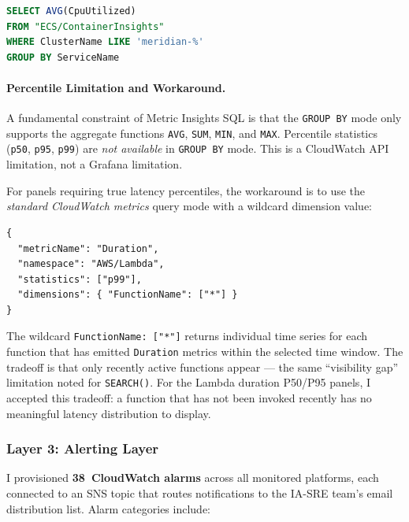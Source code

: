 \begin{lstlisting}[language=SQL, caption={Metric Insights SQL --- Platform-Filtered ECS CPU}]
SELECT AVG(CpuUtilized)
FROM "ECS/ContainerInsights"
WHERE ClusterName LIKE 'meridian-%'
GROUP BY ServiceName
\end{lstlisting}

\paragraph{Percentile Limitation and Workaround.}
A fundamental constraint of Metric Insights SQL is that the
\texttt{GROUP BY} mode only supports the aggregate functions
\texttt{AVG}, \texttt{SUM}, \texttt{MIN}, and \texttt{MAX}. Percentile
statistics (\texttt{p50}, \texttt{p95}, \texttt{p99}) are \emph{not
available} in \texttt{GROUP BY} mode. This is a CloudWatch API limitation,
not a Grafana limitation.

For panels requiring true latency percentiles, the workaround is to use
the \emph{standard CloudWatch metrics} query mode with a wildcard
dimension value:

\begin{lstlisting}[language={}, basicstyle=\ttfamily\small, caption={Grafana CloudWatch Panel --- Wildcard Dimension for p99}]
{
  "metricName": "Duration",
  "namespace": "AWS/Lambda",
  "statistics": ["p99"],
  "dimensions": { "FunctionName": ["*"] }
}
\end{lstlisting}

The wildcard \texttt{FunctionName: ["*"]} returns individual time series
for each function that has emitted \texttt{Duration} metrics within the
selected time window. The tradeoff is that only recently active functions
appear --- the same ``visibility gap'' limitation noted for \texttt{SEARCH()}.
For the Lambda duration P50/P95 panels, I accepted this tradeoff:
a function that has not been invoked recently has no meaningful latency
distribution to display.

\subsubsection{Layer 3: Alerting Layer}

I provisioned \textbf{38~CloudWatch alarms} across all monitored
platforms, each connected to an SNS topic that routes notifications to
the IA-SRE team's email distribution list. Alarm categories include:

